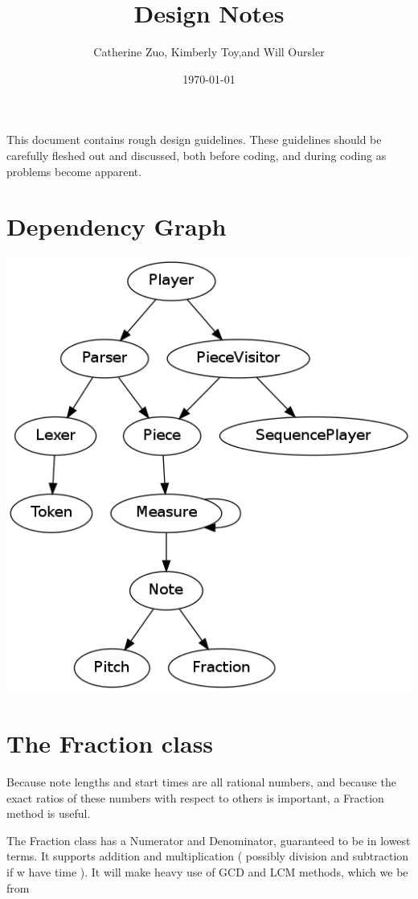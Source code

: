 \documentclass{amsart}
\begin{document}
\author{ Catherine Zuo, Kimberly Toy,and Will Oursler}
\title{Design Notes}
\date{\today}
\maketitle

This document contains rough design guidelines. These guidelines should be carefully fleshed out and discussed, both before coding, and during coding as problems become apparent.

\section{ Dependency Graph }

\includegraphics[width=\linewidth]{classes.png}

\section{ The Fraction class }

Because note lengths and start times are all rational numbers, and because the exact ratios of these numbers with respect to others is important, a Fraction method is useful.

The Fraction class has a Numerator and Denominator, guaranteed to be in lowest terms. It supports addition and multiplication ( possibly division and subtraction if w have time ). It will make heavy use of GCD and LCM methods, which we be from %
\end{document}

